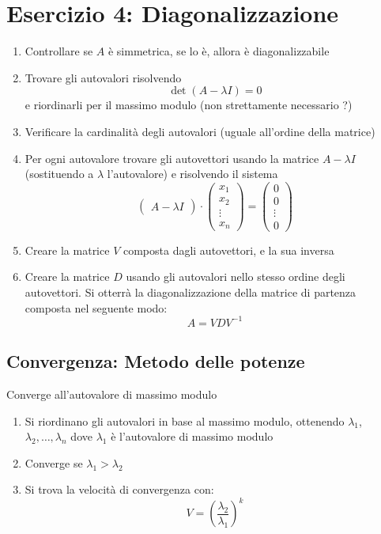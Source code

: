 \documentclass[10pt]{article}
\begin{document}
\section*{Esercizio 4: Diagonalizzazione}
\begin{enumerate}
    \item Controllare se $A$ è simmetrica, se lo è, allora è diagonalizzabile
    \item Trovare gli autovalori risolvendo \begin{equation*}
        \det(A-\lambda I)=0
    \end{equation*} e riordinarli per il massimo modulo (non strettamente necessario ?)
    \item Verificare la cardinalità degli autovalori (uguale all'ordine della matrice)
    \item Per ogni autovalore trovare gli autovettori usando la matrice $A-\lambda I$ (sostituendo a $\lambda$ l'autovalore) e risolvendo il sistema \begin{equation*}
        \begin{pmatrix}
            A - \lambda I
        \end{pmatrix}
        \cdot
        \begin{pmatrix}
            x_{1} \\ x_{2} \\ \vdots \\ x_{n}
        \end{pmatrix}
        = \begin{pmatrix}
            0 \\ 0 \\ \vdots \\ 0
        \end{pmatrix}
    \end{equation*}
    \item Creare la matrice $V$ composta dagli autovettori, e la sua inversa
    \item Creare la matrice $D$ usando gli autovalori nello stesso ordine degli autovettori. Si otterrà la diagonalizzazione della matrice di partenza composta nel seguente modo: \begin{equation*}
        A = VDV^{-1}
    \end{equation*}
\end{enumerate}
\subsection{Convergenza: Metodo delle potenze}
Converge all'autovalore di massimo modulo
\begin{enumerate}
    \item Si riordinano gli autovalori in base al massimo modulo, ottenendo $\lambda_{1}$, $\lambda_{2}, \ldots, \lambda_{n}$ dove $\lambda_{1}$ è l'autovalore di massimo modulo
    \item Converge se $\lambda_{1}>\lambda_{2}$
    \item Si trova la velocità di convergenza con: \begin{equation*}
        V=\left(\frac{\lambda_{2}}{\lambda_{1}}\right)^{k}
    \end{equation*}
\end{enumerate} 
\end{document}
